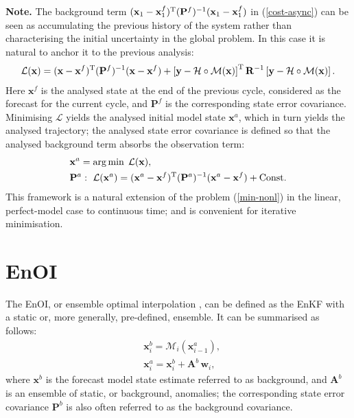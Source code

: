 \documentclass[11pt]{report}
\newcommand{\mb} {\mathbf}
\newcommand{\T}{^{\tiny \mathrm T}}
\begin{document}
{
  \setlength{\abovedisplayskip}{2pt}
  \setlength{\belowdisplayskip}{2pt}
  \scriptsize
  {\bf Note.} The background term $(\mb x_1 - \mb x_1^f)\T (\mb P^f)^{-1} (\mb x_1 - \mb x_1^f)$ in (\ref{cost-async}) can be seen as accumulating the previous history of the system rather than characterising the initial uncertainty in the global problem.
  In this case it is natural to anchor it to the previous analysis:
  \begin{align}
    \mathcal L(\mb x) = (\mb x - \mb x^f)\T (\mb P^f)^{-1} (\mb x - \mb x^f) + \left [ \mb y - \mathcal H \circ \mathcal M(\mb x) \right ] \T \mb R^{-1} \left [ \mb y - \mathcal H \circ \mathcal M(\mb x) \right ].
  \end{align}
  Here $\mb x^f$ is the analysed state at the end of the previous cycle, considered as the forecast for the current cycle, and $\mb P^f$ is the corresponding state error covariance.
  Minimising $\mathcal L$ yields the analysed initial model state $\mb x^a$, which in turn yields the analysed trajectory; the analysed state error covariance is defined so that the analysed background term absorbs the observation term:
  \begin{align*}
    &\mb x^a = \arg \min \; \mathcal L(\mb x),\\
    &\mb P^a: \ \mathcal L(\mb x^a) = (\mb x^a - \mb x^f)\T (\mb P^a)^{-1} (\mb x^a - \mb x^f) + \mathrm{Const}.
  \end{align*}
  This framework is a natural extension of the problem (\ref{min-nonl}) in the linear, perfect-model case to continuous time; and is convenient for iterative minimisation.\par
}

\section{EnOI}

The EnOI, or ensemble optimal interpolation \citep{eve03a}, can be defined as the EnKF with a static or, more generally, pre-defined, ensemble.
It can be summarised as follows:
\begin{align}
  \label{enoi-for}
  & \mb x^b_i = \mathcal M_i(\mb x^a_{i-1}),\\
  & \mb x^a_i = \mb x^b_i + \mb A^b \, \mb w_i,
\end{align}
where $\mb x^b$ is the forecast model state estimate referred to as background, and $\mb A^b$ is an ensemble of static, or background, anomalies; the corresponding state error covariance $\mb P^b$ is also often referred to as the background covariance.
\end{document}
